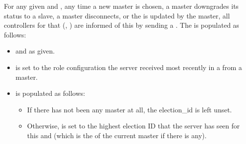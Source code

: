 \documentclass[11pt]{article}
\begin{document}
{%
\noindent{}For any given  and , any time a new master is chosen, a
master downgrades its status to a slave, a master disconnects, or the
 is updated by the master, all controllers for that
(, ) are informed of this by sending a
. The  is populated as follows:%

\begin{itemize}%

\item{}
 and  as given.%

\item{}
 is set to the role configuration the server received most
recently in a  from a master.%

\item{}
 is populated as follows:%

\begin{itemize}%

\item{}
If there has not been any master at all, the election\_id is left unset.%

\item{}
Otherwise,  is set to the highest election ID that the server
has seen for this  and  (which is the  of
the current master if there is any).%
\end{itemize}%


\end{itemize}}
\end{document}
